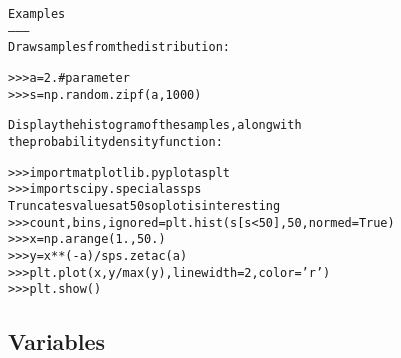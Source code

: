 \begin{boxedminipage}{\funcwidth}
\begin{alltt}
Examples
--------
Draw samples from the distribution:

{\textgreater}{\textgreater}{\textgreater} a = 2. \# parameter
{\textgreater}{\textgreater}{\textgreater} s = np.random.zipf(a, 1000)

Display the histogram of the samples, along with
the probability density function:

{\textgreater}{\textgreater}{\textgreater} import matplotlib.pyplot as plt
{\textgreater}{\textgreater}{\textgreater} import scipy.special as sps
Truncate s values at 50 so plot is interesting
{\textgreater}{\textgreater}{\textgreater} count, bins, ignored = plt.hist(s[s{\textless}50], 50, normed=True)
{\textgreater}{\textgreater}{\textgreater} x = np.arange(1., 50.)
{\textgreater}{\textgreater}{\textgreater} y = x**(-a)/sps.zetac(a)
{\textgreater}{\textgreater}{\textgreater} plt.plot(x, y/max(y), linewidth=2, color='r')
{\textgreater}{\textgreater}{\textgreater} plt.show()
\end{alltt}

\setlength{\parskip}{1ex}
    \end{boxedminipage}



  \subsection{Variables}

